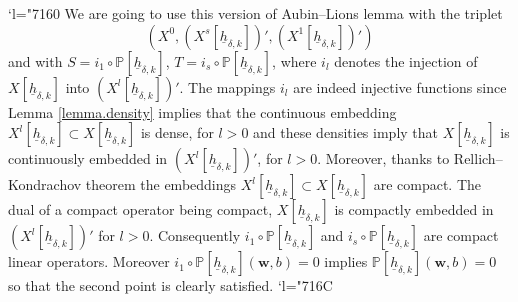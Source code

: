 \documentclass[10pt]{amsart}
\newcommand{\Changel}{\mathcode`l="7160}
\newcommand{\Changelback}{\mathcode`l="716C}
\theoremstyle{remark}
\theoremstyle{definition}
\newcommand{\wg}{\boldsymbol{w}}
\newcommand{\hb}{{\underline{h}}}
\begin{document}
\Changel
We are going to use this version of Aubin--Lions lemma with the triplet
\[
(X^0,(X^{s}[\hb_{\delta, k}])',(X^{1}[\hb_{\delta, k}])')
\]
and with $S= i_1\circ \mathbb{P}[\hb_{\delta, k}]$, $T=i_s\circ \mathbb{P}[\hb_{\delta, k}]$, where $i_l$ denotes the injection of $X[\hb_{\delta, k}]$ into $(X^{l}[\hb_{\delta, k}])'$. The mappings $i_l$ are indeed injective functions since Lemma \ref{lemma.density} implies that the continuous embedding $X^l[\hb_{\delta,k}] \subset X[\hb_{\delta, k}]$ is dense, for $l>0$ and these densities imply that $X[\hb_{\delta, k}]$ is continuously embedded in $(X^{l}[\hb_{\delta, k}])'$, for $l>0$. Moreover, thanks to Rellich--Kondrachov theorem the embeddings $X^l[\hb_{\delta,k}] \subset X[\hb_{\delta, k}]$ are compact. The dual of a compact operator being compact, $X[\hb_{\delta, k}] $ is compactly embedded in $(X^{l}[\hb_{\delta, k}])'$ for $l>0$. Consequently $i_1\circ \mathbb{P}[\hb_{\delta, k}]$ and $i_s\circ \mathbb{P}[\hb_{\delta, k}]$ are compact linear operators. Moreover $i_1\circ \mathbb{P}[\hb_{\delta, k}](\wg, b)=0$ implies $\mathbb{P}[\hb_{\delta, k}](\wg, b)=0$ so that the second point is clearly satisfied.
\Changelback
\end{document}
